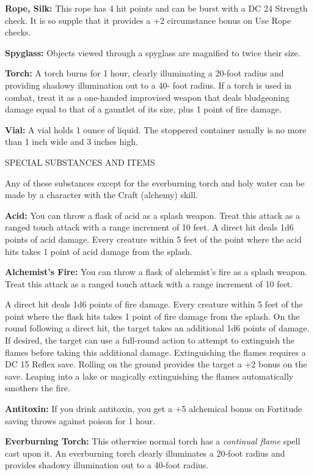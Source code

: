 \documentclass{article}
\begin{document}
\textbf{Rope, Silk:} This rope has 4 hit points and can be burst with a DC 24 Strength 
check. It is so supple that it provides a +2 circumstance bonus on Use Rope checks.

\textbf{Spyglass:} Objects viewed through a spyglass are magnified to twice their 
size.

\textbf{Torch:} A torch burns for 1 hour, clearly illuminating a 20-foot radius 
and providing shadowy illumination out to a 40- foot radius. If a torch is used 
in combat, treat it as a one-handed improvised weapon that deals bludgeoning damage 
equal to that of a gauntlet of its size, plus 1 point of fire damage.

\textbf{Vial:} A vial holds 1 ounce of liquid. The stoppered container usually 
is no more than 1 inch wide and 3 inches high.

\vspace{12pt}
SPECIAL SUBSTANCES AND ITEMS

Any of these substances except for the everburning torch and holy water can be 
made by a character with the Craft (alchemy) skill.

\textbf{Acid: }You can throw a flask of acid as a splash weapon. Treat this attack 
as a ranged touch attack with a range increment of 10 feet. A direct hit deals 
1d6 points of acid damage. Every creature within 5 feet of the point where the 
acid hits takes 1 point of acid damage from the splash.

\textbf{Alchemist's Fire:} You can throw a flask of alchemist's fire as a splash 
weapon. Treat this attack as a ranged touch attack with a range increment of 10 
feet.

A direct hit deals 1d6 points of fire damage. Every creature within 5 feet of the 
point where the flask hits takes 1 point of fire damage from the splash. On the 
round following a direct hit, the target takes an additional 1d6 points of damage. 
If desired, the target can use a full-round action to attempt to extinguish the 
flames before taking this additional damage. Extinguishing the flames requires 
a DC 15 Reflex save. Rolling on the ground provides the target a +2 bonus on the 
save. Leaping into a lake or magically extinguishing the flames automatically smothers 
the fire.

\textbf{Antitoxin:} If you drink antitoxin, you get a +5 alchemical bonus on Fortitude 
saving throws against poison for 1 hour.

\textbf{Everburning Torch:} This otherwise normal torch has a \textit{continual 
flame }spell cast upon it. An everburning torch clearly illuminates a 20-foot radius 
and provides shadowy illumination out to a 40-foot radius.
\end{document}
